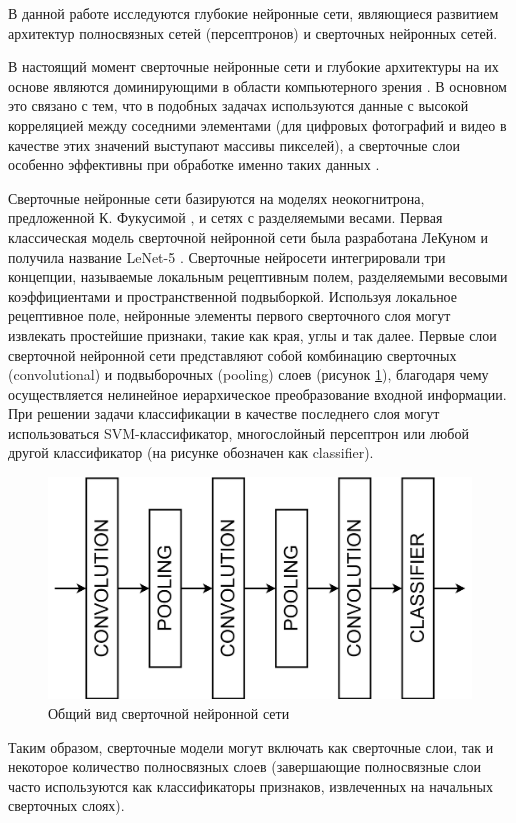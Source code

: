 В данной работе исследуются глубокие нейронные сети, являющиеся развитием архитектур полносвязных сетей (персептронов) и сверточных нейронных сетей.

В настоящий момент сверточные нейронные сети и глубокие архитектуры на их основе являются доминирующими в области компьютерного зрения \cite[c.~436]{LeCun2015}. В основном это связано с тем, что в подобных задачах используются данные с высокой корреляцией между соседними элементами (для цифровых фотографий и видео в качестве этих значений выступают массивы пикселей), а сверточные слои особенно эффективны при обработке именно таких данных \cite[c.~8]{Emmert2020}.

Сверточные нейронные сети базируются на моделях неокогнитрона, предложенной К. Фукусимой \cite[c.~193]{fukushima1980}, и сетях с разделяемыми весами. Первая классическая модель сверточной нейронной сети была разработана ЛеКуном и получила название LeNet-5 \cite[c.~7]{lekun1998}. Сверточные нейросети интегрировали три концепции, называемые локальным рецептивным полем, разделяемыми весовыми коэффициентами и пространственной подвыборкой. Используя локальное рецептивное поле, нейронные элементы первого сверточного слоя могут извлекать простейшие признаки, такие как края, углы и так далее. Первые слои сверточной нейронной сети представляют собой комбинацию сверточных (convolutional) и подвыборочных (pooling) слоев (рисунок \ref{fig:cnn_common_view}), благодаря чему осуществляется нелинейное иерархическое преобразование входной информации. При решении задачи классификации в качестве последнего слоя могут использоваться SVM-классификатор, многослойный персептрон или любой другой классификатор (на рисунке обозначен как classifier).

\begin{figure}[ht]
	\centering
	\includegraphics[width=14cm]{man-source/images/ch4/pic4-15.png}
	\caption{Общий вид сверточной нейронной сети}
	\label{fig:cnn_common_view}
\end{figure}
Таким образом, сверточные модели могут включать как сверточные слои, так и некоторое количество полносвязных слоев (завершающие полносвязные слои часто используются как классификаторы признаков, извлеченных на начальных сверточных слоях). %


